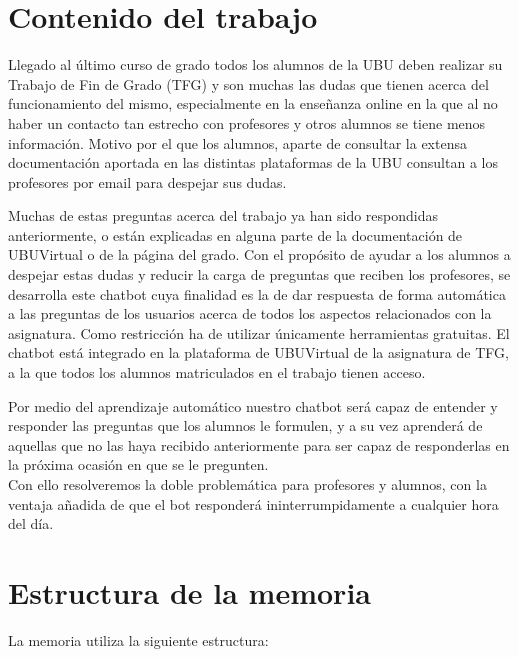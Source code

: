 
\section{Contenido del trabajo}

Llegado al último curso de grado todos los alumnos de la UBU deben realizar su Trabajo de Fin de Grado (TFG) y son muchas las dudas que tienen acerca del funcionamiento del mismo, especialmente en la enseñanza online en la que al no haber un contacto tan estrecho con profesores y otros alumnos se tiene menos información. Motivo por el que los alumnos, aparte de consultar la extensa documentación aportada en las distintas plataformas de la UBU consultan a los profesores por email para despejar sus dudas.

Muchas de estas preguntas acerca del trabajo ya han sido respondidas anteriormente, o están explicadas en alguna parte de la documentación de UBUVirtual o de la página del grado. Con el propósito de ayudar a los alumnos a despejar estas dudas y reducir la carga de preguntas que reciben los profesores, se desarrolla este chatbot cuya finalidad es la de dar respuesta de forma automática a las preguntas de los usuarios acerca de todos los aspectos relacionados con la asignatura. Como restricción ha de utilizar únicamente herramientas gratuitas. El chatbot está integrado en la plataforma de UBUVirtual de la asignatura de TFG, a la que todos los alumnos matriculados en el trabajo tienen acceso. 

Por medio del aprendizaje automático nuestro chatbot será capaz de entender y responder las preguntas que los alumnos le formulen, y a su vez aprenderá de aquellas que no las haya recibido anteriormente para ser capaz de responderlas en la próxima ocasión en que se le pregunten.\\
Con ello resolveremos la doble problemática para profesores y alumnos, con la ventaja añadida de que el bot responderá ininterrumpidamente a cualquier hora del día.

\newpage

\section{Estructura de la memoria}

La memoria utiliza la siguiente estructura:

